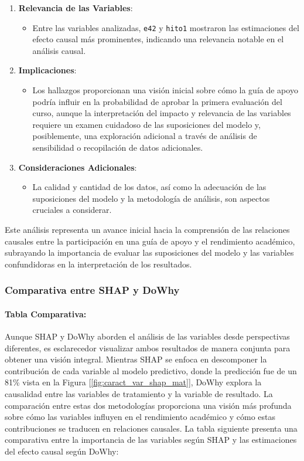 \begin{enumerate}
    \item \textbf{Relevancia de las Variables}:
        \begin{itemize}
            \item Entre las variables analizadas, \texttt{e42} y \texttt{hito1} mostraron las estimaciones del efecto causal más prominentes, indicando una relevancia notable en el análisis causal.
        \end{itemize}
    
    \item \textbf{Implicaciones}:
        \begin{itemize}
            \item Los hallazgos proporcionan una visión inicial sobre cómo la guía de apoyo podría influir en la probabilidad de aprobar la primera evaluación del curso, aunque la interpretación del impacto y relevancia de las variables requiere un examen cuidadoso de las suposiciones del modelo y, posiblemente, una exploración adicional a través de análisis de sensibilidad o recopilación de datos adicionales.
        \end{itemize}
    
    \item \textbf{Consideraciones Adicionales}:
        \begin{itemize}
            \item La calidad y cantidad de los datos, así como la adecuación de las suposiciones del modelo y la metodología de análisis, son aspectos cruciales a considerar.
        \end{itemize}
\end{enumerate}

Este análisis representa un avance inicial hacia la comprensión de las relaciones causales entre la participación en una guía de apoyo y el rendimiento académico, subrayando la importancia de evaluar las suposiciones del modelo y las variables confundidoras en la interpretación de los resultados.

\subsubsection{Comparativa entre SHAP y DoWhy}

\paragraph{Tabla Comparativa:} Aunque SHAP y DoWhy aborden el análisis de las variables desde perspectivas diferentes, es esclarecedor visualizar ambos resultados de manera conjunta para obtener una visión integral. Mientras SHAP se enfoca en descomponer la contribución de cada variable al modelo predictivo, donde la predicción fue de un 81\% vista en la Figura [\ref{fig:caract_var_shap_mat}], DoWhy explora la causalidad entre las variables de tratamiento y la variable de resultado. La comparación entre estas dos metodologías proporciona una visión más profunda sobre cómo las variables influyen en el rendimiento académico y cómo estas contribuciones se traducen en relaciones causales. La tabla siguiente presenta una comparativa entre la importancia de las variables según SHAP y las estimaciones del efecto causal según DoWhy:

